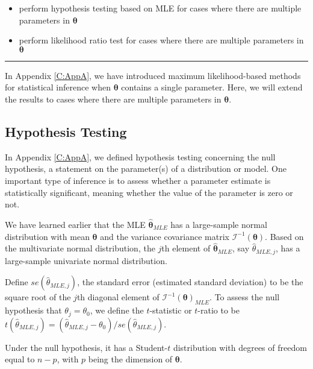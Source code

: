 \documentclass[]{book}
\providecommand{\tightlist}{%
  \setlength{\itemsep}{0pt}\setlength{\parskip}{0pt}}
\theoremstyle{definition}
\theoremstyle{definition}
\theoremstyle{definition}
\theoremstyle{remark}
\begin{document}
\begin{itemize}
\tightlist
\item
  perform hypothesis testing based on MLE for cases where there are
  multiple parameters in \(\boldsymbol\theta\)
\item
  perform likelihood ratio test for cases where there are multiple
  parameters in \(\boldsymbol\theta\)
\end{itemize}

\begin{center}\rule{0.5\linewidth}{\linethickness}\end{center}

In Appendix \ref{C:AppA}, we have introduced maximum likelihood-based
methods for statistical inference when \(\boldsymbol\theta\) contains a
single parameter. Here, we will extend the results to cases where there
are multiple parameters in \(\boldsymbol\theta\).

\subsection{Hypothesis Testing}\label{hypothesis-testing}

In Appendix \ref{C:AppA}, we defined hypothesis testing concerning the
null hypothesis, a statement on the parameter(s) of a distribution or
model. One important type of inference is to assess whether a parameter
estimate is statistically significant, meaning whether the value of the
parameter is zero or not.

We have learned earlier that the MLE \(\hat{\boldsymbol{\theta}}_{MLE}\)
has a large-sample normal distribution with mean \(\boldsymbol \theta\)
and the variance covariance matrix
\(\mathcal{I}^{-1}(\boldsymbol \theta)\). Based on the multivariate
normal distribution, the \(j\)th element of
\(\hat{\boldsymbol{\theta}}_{MLE}\), say \(\hat{\theta}_{MLE,j}\), has a
large-sample univariate normal distribution.

Define \(se(\hat{\theta}_{MLE,j})\), the standard error (estimated
standard deviation) to be the square root of the \(j\)th diagonal
element of \(\mathcal{I}^{-1}(\boldsymbol \theta)_{MLE}\). To assess the
null hypothesis that \(\theta_j=\theta_0\), we define the
\(t\)-statistic or \(t\)-ratio to be
\(t(\hat{\theta}_{MLE,j})=(\hat{\theta}_{MLE,j}-\theta_0)/se(\hat{\theta}_{MLE,j})\).

Under the null hypothesis, it has a Student-\(t\) distribution with
degrees of freedom equal to \(n-p\), with \(p\) being the dimension of
\(\boldsymbol{\theta}\).
\end{document}

